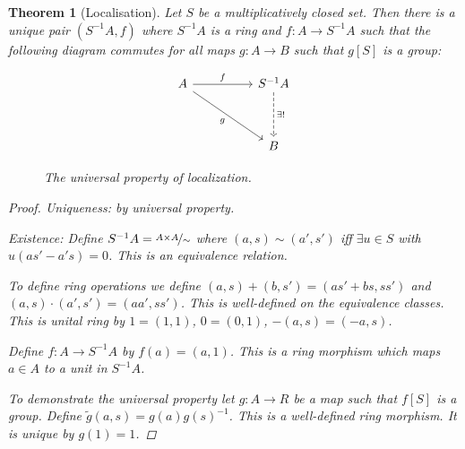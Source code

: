 \documentclass{article}
\newtheorem{theorem}{Theorem}[section]
\theoremstyle{definition}
\begin{document}
\begin{theorem}[Localisation]
    Let \(S\) be a multiplicatively closed set. Then there is a unique pair
    \((S^{-1}A,f)\) where \(S^{-1}A\) is a ring and \(f:A\to S^{-1}A\) such that
    the following diagram commutes for all maps \(g:A\to B\) such that \(g[S]\)
    is a group:
    \begin{figure}[H]
        \[
            \begin{tikzcd}[ampersand replacement=\&]
                A \&\& {S^{-1}A} \\
                \\
                \&\& B
                \arrow["f", from=1-1, to=1-3]
                \arrow["g"', from=1-1, to=3-3]
                \arrow["\exists!", dashed, from=1-3, to=3-3]
            \end{tikzcd}
        \]
        \caption{The universal property of localization.}
        \label{fig:localization}
    \end{figure}

    \begin{proof}
        Uniqueness: by universal property.

        Existence: Define \(S^{-1}A=\nicefrac{A\times A}{\sim}\) where
        \((a,s)\sim (a',s')\) iff \(\exists u\in S\) with \(u(as'-a's)=0\). This
        is an equivalence relation.

        To define ring operations we define \((a,s)+(b,s')=(as'+bs,ss')\) and
        \((a,s)\cdot (a',s')=(aa',ss')\). This is well-defined on the
        equivalence classes. This is unital ring by \(1=(1,1)\),
        \(0=(0,1)\), \(-(a,s)=(-a,s)\).

        Define \(f:A\to S^{-1}A\) by \(f(a)=(a,1)\). This is a ring morphism
        which maps \(a\in A\) to a unit in \(S^{-1}A\).

        To demonstrate the universal property let \(g:A\to R\) be a map such
        that \(f[S]\) is a group. Define \(\tilde{g}(a,s)=g(a)g(s)^{-1}\). This
        is a well-defined ring morphism. It is unique by \(g(1)=1\).
    \end{proof}
\end{theorem}
\end{document}
